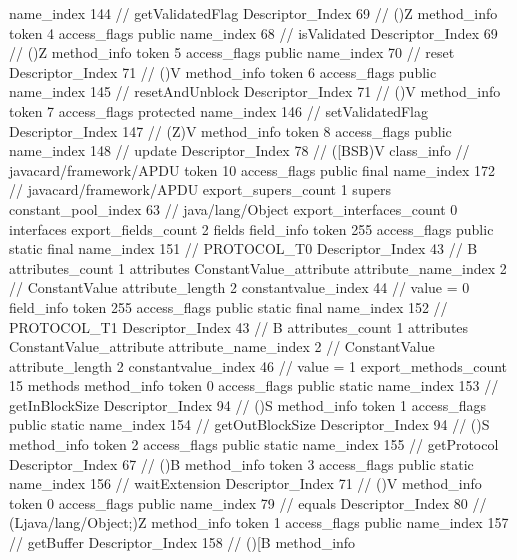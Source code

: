 {{{{{					name_index	144		// getValidatedFlag
					Descriptor_Index	69		// ()Z
				}
				method_info {
					token	4
					access_flags	public
					name_index	68		// isValidated
					Descriptor_Index	69		// ()Z
				}
				method_info {
					token	5
					access_flags	public
					name_index	70		// reset
					Descriptor_Index	71		// ()V
				}
				method_info {
					token	6
					access_flags	public
					name_index	145		// resetAndUnblock
					Descriptor_Index	71		// ()V
				}
				method_info {
					token	7
					access_flags	protected
					name_index	146		// setValidatedFlag
					Descriptor_Index	147		// (Z)V
				}
				method_info {
					token	8
					access_flags	public
					name_index	148		// update
					Descriptor_Index	78		// ([BSB)V
				}
			}
		}
		class_info {		// javacard/framework/APDU
			token	10
			access_flags	public final
			name_index	172		// javacard/framework/APDU
			export_supers_count	1
			supers {
				constant_pool_index	63		// java/lang/Object
			}
			export_interfaces_count	0
			interfaces {
			}
			export_fields_count	2
			fields {
			field_info {
				token	255
				access_flags	public static final
				name_index	151		// PROTOCOL_T0
				Descriptor_Index	43		// B
				attributes_count	1
				attributes {
				ConstantValue_attribute {
					attribute_name_index	2		// ConstantValue
					attribute_length	2
					constantvalue_index	44		// value = 0
				}
				}
			}
			field_info {
				token	255
				access_flags	public static final
				name_index	152		// PROTOCOL_T1
				Descriptor_Index	43		// B
				attributes_count	1
				attributes {
				ConstantValue_attribute {
					attribute_name_index	2		// ConstantValue
					attribute_length	2
					constantvalue_index	46		// value = 1
				}
				}
			}
			}
			export_methods_count	15
			methods {
				method_info {
					token	0
					access_flags	public static
					name_index	153		// getInBlockSize
					Descriptor_Index	94		// ()S
				}
				method_info {
					token	1
					access_flags	public static
					name_index	154		// getOutBlockSize
					Descriptor_Index	94		// ()S
				}
				method_info {
					token	2
					access_flags	public static
					name_index	155		// getProtocol
					Descriptor_Index	67		// ()B
				}
				method_info {
					token	3
					access_flags	public static
					name_index	156		// waitExtension
					Descriptor_Index	71		// ()V
				}
				method_info {
					token	0
					access_flags	public
					name_index	79		// equals
					Descriptor_Index	80		// (Ljava/lang/Object;)Z
				}
				method_info {
					token	1
					access_flags	public
					name_index	157		// getBuffer
					Descriptor_Index	158		// ()[B
				}
				method_info {
}}}}}
